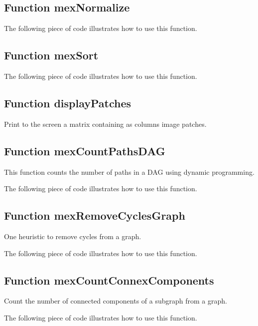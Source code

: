 \documentclass[a4paper, 11pt]{article}
\begin{document}
\subsection{Function mexNormalize}
%    

The following piece of code illustrates how to use this function.


\subsection{Function mexSort}
%    

The following piece of code illustrates how to use this function.


\subsection{Function displayPatches}
Print to the screen a matrix containing as columns image patches.

\subsection{Function mexCountPathsDAG}
This function counts the number of paths in a DAG using dynamic programming.

The following piece of code illustrates how to use this function.


\subsection{Function mexRemoveCyclesGraph}
One heuristic to remove cycles from a graph.

The following piece of code illustrates how to use this function.


\subsection{Function mexCountConnexComponents}
Count the number of connected components of a subgraph from a graph.

The following piece of code illustrates how to use this function.

\end{document}
